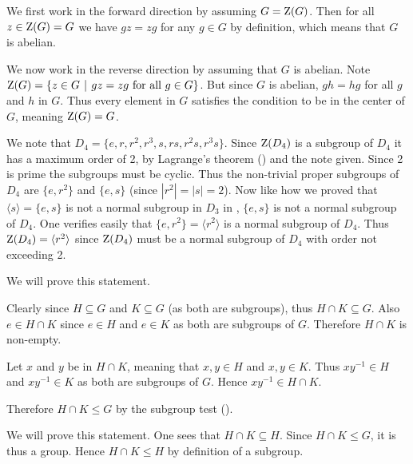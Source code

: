 \begin{questions}
\begin{partquestions}{\alph*}
        \item We first work in the forward direction by assuming $G = \mathrm{Z}(G)$. Then for all $z \in \mathrm{Z}(G) = G$ we have $gz = zg$ for any $g \in G$ by definition, which means that $G$ is abelian.

        We now work in the reverse direction by assuming that $G$ is abelian. Note $\CenterGrp{G} = \{z \in G \vert gz = zg \text{ for all } g \in G\}$. But since $G$ is abelian, $gh = hg$ for all $g$ and $h$ in $G$. Thus every element in $G$ satisfies the condition to be in the center of $G$, meaning $\mathrm{Z}(G) = G$.

        \item We note that $D_4 = \{e, r, r^2, r^3, s, rs, r^2s, r^3s\}$. Since $\mathrm{Z}(D_4)$ is a subgroup of $D_4$ it has a maximum order of 2, by Lagrange's theorem () and the note given. Since 2 is prime the subgroups must be cyclic. Thus the non-trivial proper subgroups of $D_4$ are $\{e, r^2\}$ and $\{e, s\}$ (since $|r^2| = |s| = 2$). Now like how we proved that $\langle s \rangle = \{e, s\}$ is not a normal subgroup in $D_3$ in , $\{e, s\}$ is not a normal subgroup of $D_4$. One verifies easily that $\{e, r^2\} = \langle r^2 \rangle$ is a normal subgroup of $D_4$. Thus $\mathrm{Z}(D_4) = \langle r^2 \rangle$ since $\mathrm{Z}(D_4)$ must be a normal subgroup of $D_4$ with order not exceeding 2.
    \end{partquestions}

    \item \begin{partquestions}{\alph*}
        \item We will prove this statement.

        Clearly since $H \subseteq G$ and $K \subseteq G$ (as both are subgroups), thus $H \cap K \subseteq G$. Also $e \in H \cap K$ since $e \in H$ and $e \in K$ as both are subgroups of $G$. Therefore $H \cap K$ is non-empty.

        Let $x$ and $y$ be in $H \cap K$, meaning that $x, y \in H$ and $x, y \in K$. Thus $xy^{-1} \in H$ and $xy^{-1} \in K$ as both are subgroups of $G$. Hence $xy^{-1} \in H \cap K$.

        Therefore $H \cap K \leq G$ by the subgroup test ().

        \item We will prove this statement. One sees that $H \cap K \subseteq H$. Since $H \cap K \leq G$, it is thus a group. Hence $H \cap K \leq H$ by definition of a subgroup.


\end{partquestions}
\end{questions}
